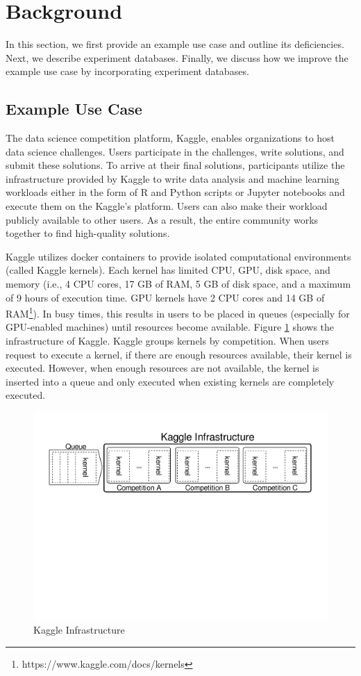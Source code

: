 \section{Background} \label{sec-background}
In this section, we first provide an example use case and outline its deficiencies.
Next, we describe experiment databases.
Finally, we discuss how we improve the example use case by incorporating experiment databases.
\subsection{Example Use Case}
The data science competition platform, Kaggle, enables organizations to host data science challenges.
Users participate in the challenges, write solutions, and submit these solutions.
To arrive at their final solutions, participants utilize the infrastructure provided by Kaggle to write data analysis and machine learning workloads either in the form of R and Python scripts or Jupyter notebooks and execute them on the Kaggle's platform.
Users can also make their workload publicly available to other users.
As a result, the entire community works together to find high-quality solutions.

Kaggle utilizes docker containers to provide isolated computational environments (called Kaggle kernels).
Each kernel has limited CPU, GPU, disk space, and memory (i.e., 4 CPU cores, 17 GB of RAM, 5 GB of disk space, and a maximum of 9 hours of execution time. GPU kernels have 2 CPU cores and 14 GB of RAM\footnote{https://www.kaggle.com/docs/kernels}).
In busy times, this results in users to be placed in queues (especially for GPU-enabled machines) until resources become available.
Figure \ref{example-use-case} shows the infrastructure of Kaggle.
Kaggle groups kernels by competition.
When users request to execute a kernel, if there are enough resources available, their kernel is executed.
However, when enough resources are not available, the kernel is inserted into a queue and only executed when existing kernels are completely executed.

\begin{figure}
\centering
\includegraphics[width=\columnwidth]{../images/example-use-case}
\caption{Kaggle Infrastructure}
\label{example-use-case}
\end{figure}

